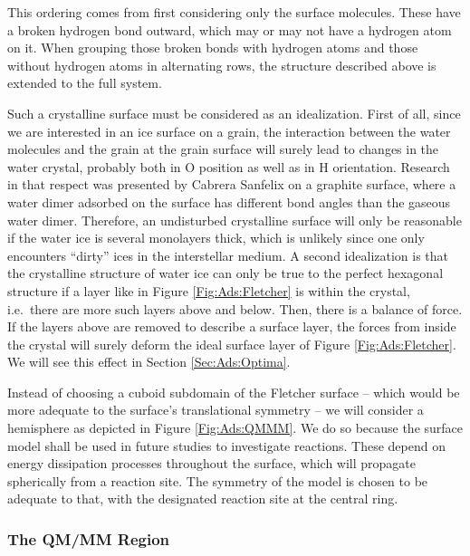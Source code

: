 This ordering comes from first considering only the surface molecules. These
have a broken hydrogen bond outward, which may or may not have a hydrogen
atom on it. When grouping those broken bonds with hydrogen atoms and those
without hydrogen atoms in alternating rows, the structure described above is
extended to the full system.

Such a crystalline surface must be considered as an idealization. First of all,
since we are interested in an ice surface on a grain, the interaction between
the water molecules and the grain at the grain surface will surely lead to
changes in the water crystal, probably both in O position as well as in H
orientation.
Research in that respect was presented by Cabrera Sanfelix
\etal\cite{CabreraSanfelix2003} on a graphite surface, where a water dimer
adsorbed on the surface has different bond angles than the gaseous water dimer.
Therefore, an undisturbed crystalline surface will only be reasonable if the
water ice is several monolayers thick, which is unlikely since one only
encounters ``dirty'' ices in the interstellar
medium.\cite{BoogertGerakinesWhittet2015} A second idealization is that the crystalline structure of water ice can only be true to the perfect hexagonal structure if a layer like
in Figure \ref{Fig:Ads:Fletcher} is within the crystal, i.e.\ there are more
such layers above and below. Then, there is a balance of force. If the layers
above are removed to describe a surface layer, the forces from inside the
crystal will surely deform the ideal surface layer of Figure
\ref{Fig:Ads:Fletcher}.
We will see this effect in Section \ref{Sec:Ads:Optima}.

Instead of choosing a cuboid subdomain of the Fletcher surface -- which would be more adequate
to the surface's translational symmetry -- we will consider a hemisphere as depicted in Figure
\ref{Fig:Ads:QMMM}. We do so because the surface model shall be used in future studies
to investigate reactions. These depend on energy dissipation processes throughout the
surface, which will propagate spherically from a reaction site. The symmetry of the model
is chosen to be adequate to that, with the designated reaction site at the
central ring.

\subsubsection{The QM/MM Region}
\label{Sec:Ads:QM/MM}

